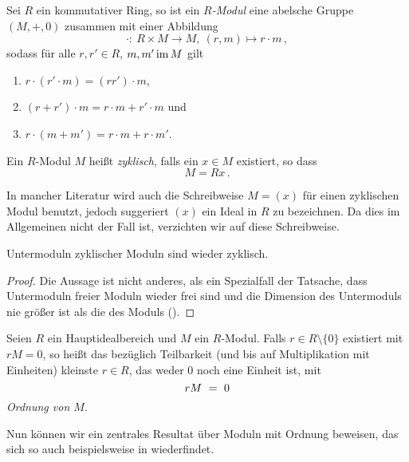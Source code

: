 \begin{definition}[Modul]
  Sei $R$ ein kommutativer Ring, so ist ein \emph{$R$-Modul}
  eine abelsche Gruppe $(M,+,0)$ zusammen mit einer 
  Abbildung 
  \[ \cdot:\ R \times M \to M,\ (r,m) \mapsto r\cdot m\,,\]
  sodass für alle $r, r' \in R$, $m,m' \operatorname{im} M$ gilt
  \begin{enumerate}
    \item $r\cdot (r'\cdot m) = (rr')\cdot m$,
    \item $(r+r')\cdot m = r\cdot m + r'\cdot m$ und 
    \item $r\cdot(m+m') = r\cdot m + r\cdot m'$.
  \end{enumerate}
\end{definition}


\begin{definition}
  Ein $R$-Modul $M$ heißt \emph{zyklisch}, falls
  ein $x\in M$ existiert, so dass
  \[ M = Rx\,.\]
\end{definition}

\begin{bemerkung}
  In mancher Literatur wird auch die Schreibweise $M = (x)$ für einen
  zyklischen Modul benutzt, jedoch suggeriert $(x)$ ein Ideal in $R$ zu
  bezeichnen. Da dies im Allgemeinen nicht der Fall ist, verzichten wir auf
  diese Schreibweise.
\end{bemerkung}


\begin{satz}
  \label{satz:untermoduln_bleiben_zyklisch}
  Untermoduln zyklischer Moduln sind wieder zyklisch.
\end{satz}
\begin{proof}
  Die Aussage ist nicht anderes, als ein Spezialfall der Tatsache, dass
  Untermoduln freier Moduln wieder frei sind und die Dimension des Untermoduls
  nie größer ist als die des Moduls 
  (\autocite[Theorem 7.1]{lang2002algebra}).
\end{proof}

\begin{definition}
  Seien $R$ ein Hauptidealbereich und $M$ ein $R$-Modul. 
  Falls $r \in R\setminus\{0\}$ existiert mit $rM = 0$, so heißt
  das bezüglich Teilbarkeit (und bis auf Multiplikation mit Einheiten) kleinste
  $r \in R$, das weder $0$ noch eine Einheit ist, mit
  \[ rM \ =\  0\]
  \emph{Ordnung von $M$}.
\end{definition}

Nun können wir ein zentrales Resultat über Moduln mit Ordnung beweisen, das
sich so auch beispielsweise in \autocite[Lemma 8.10]{hartley1974rings}
wiederfindet.

